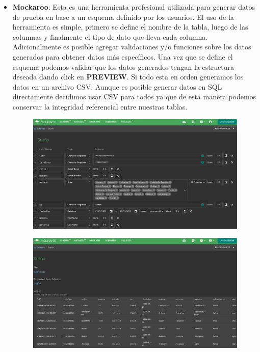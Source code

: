 \documentclass{exam}
\begin{document}
	\begin{itemize}
		\item \textbf{Mockaroo}: Esta es una herramienta profesional utilizada para generar datos de prueba en base a un esquema definido por los usuarios. El uso de la herramienta es simple, primero se define el nombre de la tabla, luego de las columnas y finalmente el tipo de dato que lleva cada columna. Adicionalmente es posible agregar validaciones y/o funciones sobre los datos generados para obtener datos más específicos. Una vez que se define el esquema podemos validar que los datos generados tengan la estructura deseada dando click en \textbf{PREVIEW}. Si todo esta en orden generamos los datos en un archivo CSV. Aunque es posible generar datos en SQL directamente decidimos usar CSV para todos ya que de esta manera podemos conservar la integridad referencial entre nuestras tablas.
		
		\begin{figure}[h!]
			\includegraphics[scale=0.3]{mockaroo1.png}
			\centering
		\end{figure}		
		
		\begin{figure}[h!]
			\includegraphics[scale=0.3]{mockaroo2.png}
			\centering
		\end{figure}	
		

\end{itemize}
\end{document}
